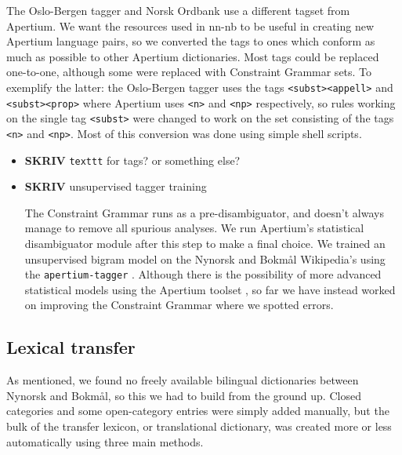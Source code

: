 \documentclass[11pt]{article}
\begin{document}
The Oslo-Bergen tagger and Norsk Ordbank use a different tagset from
Apertium. We want the resources used in nn-nb to be useful in creating
new Apertium language pairs, so we converted the tags to ones which
conform as much as possible to other Apertium dictionaries. Most tags
could be replaced one-to-one, although some were replaced with
Constraint Grammar sets. To exemplify the latter: the Oslo-Bergen
tagger uses the tags \texttt{<subst><appell>} and \texttt{<subst><prop>} where
Apertium uses \texttt{<n>} and \texttt{<np>} respectively, so rules working on the
single tag \texttt{<subst>} were changed to work on the set consisting of the
tags \texttt{<n>} and \texttt{<np>}. Most of this conversion was done using simple
shell scripts.
\begin{itemize}

\item \textbf{SKRIV} \texttt{texttt} for tags? or something else?\\
\label{sec-3.3.1}


\item \textbf{SKRIV} unsupervised tagger training\\
\label{sec-3.3.2}

The Constraint Grammar runs as a pre-disambiguator, and doesn't always
manage to remove all spurious analyses. We run Apertium's statistical
disambiguator module after this step to make a final choice. We
trained an unsupervised bigram model on the Nynorsk and Bokmål
Wikipedia's using the \texttt{apertium-tagger} \citep{todo}. Although there
is the possibility of more advanced statistical models using the
Apertium toolset
\citep[see~eg.~][]{sanchez2008utl,sheikh2009unpublished}, so far we
have instead worked on improving the Constraint Grammar where we
spotted errors.

\end{itemize} %
\subsection{Lexical transfer}
\label{sec-3.4}

As mentioned, we found no freely available bilingual dictionaries
between Nynorsk and Bokmål, so this we had to build from the ground
up. Closed categories and some open-category entries were simply added
manually, but the bulk of the transfer lexicon, or translational
dictionary, was created more or less automatically using three main
methods.
\end{document}
